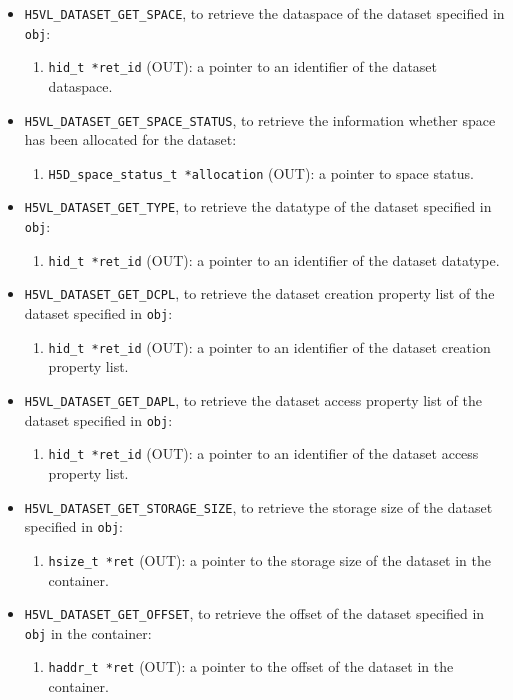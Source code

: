 \begin{itemize}
\item {\tt H5VL\_DATASET\_GET\_SPACE}, to retrieve the dataspace of the
  dataset specified in {\tt obj}:
  \begin{enumerate}
  \item {\tt hid\_t *ret\_id} (OUT): a pointer to an identifier of the
    dataset dataspace.
  \end{enumerate}

\item {\tt H5VL\_DATASET\_GET\_SPACE\_STATUS}, to retrieve the
  information whether space has been allocated for the dataset:
  \begin{enumerate}
  \item {\tt H5D\_space\_status\_t *allocation} (OUT): a pointer to
    space status.
  \end{enumerate}

\item {\tt H5VL\_DATASET\_GET\_TYPE}, to retrieve the datatype of the
  dataset specified in {\tt obj}:
  \begin{enumerate}
  \item {\tt hid\_t *ret\_id} (OUT): a pointer to an identifier of the
    dataset datatype.
  \end{enumerate}

\item {\tt H5VL\_DATASET\_GET\_DCPL}, to retrieve the dataset creation
  property list of the dataset specified in {\tt obj}:
  \begin{enumerate}
  \item {\tt hid\_t *ret\_id} (OUT): a pointer to an identifier of the
    dataset creation property list.
  \end{enumerate}

\item {\tt H5VL\_DATASET\_GET\_DAPL}, to retrieve the dataset access
  property list of the dataset specified in {\tt obj}:
  \begin{enumerate}
  \item {\tt hid\_t *ret\_id} (OUT): a pointer to an identifier of the
    dataset access property list.
  \end{enumerate}

\item {\tt H5VL\_DATASET\_GET\_STORAGE\_SIZE}, to retrieve the storage
  size of the dataset specified in {\tt obj}:
  \begin{enumerate}
  \item {\tt hsize\_t *ret} (OUT): a pointer to the storage size of
    the dataset in the container.
  \end{enumerate}

\item {\tt H5VL\_DATASET\_GET\_OFFSET}, to retrieve the offset of the
  dataset specified in {\tt obj} in the container:
  \begin{enumerate}
  \item {\tt haddr\_t *ret} (OUT): a pointer to the offset of the
    dataset in the container.
  \end{enumerate}
\end{itemize}

